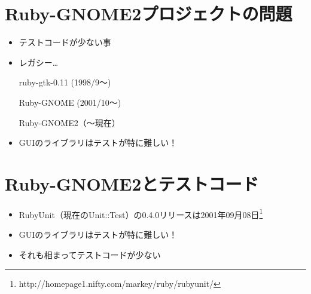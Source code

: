 \section{Ruby-GNOME2プロジェクトの問題}

\begin{frame}
\begin{itemize}
\item テストコードが少ない事
\item レガシー…

ruby-gtk-0.11 (1998/9〜)

Ruby-GNOME (2001/10〜)

Ruby-GNOME2（〜現在）

\item GUIのライブラリはテストが特に難しい！
\end{itemize}
\end{frame}

\section{Ruby-GNOME2とテストコード}

\begin{frame}
\begin{itemize}
\item RubyUnit（現在のUnit::Test）の0.4.0リリースは2001年09月08日\footnote{http://homepage1.nifty.com/markey/ruby/rubyunit/}
\item GUIのライブラリはテストが特に難しい！
\item それも相まってテストコードが少ない
\end{itemize}
\end{frame}
